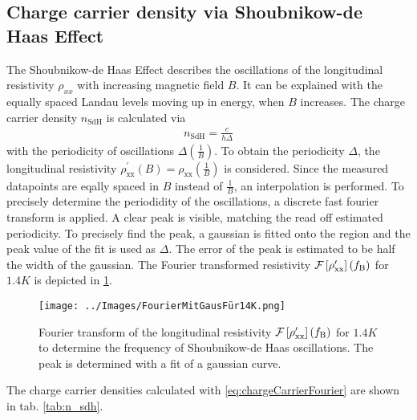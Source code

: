 \subsection{Charge carrier density via Shoubnikow-de Haas Effect}
The Shoubnikow-de Haas Effect describes the oscillations of the longitudinal resistivity $\rho_{xx}$ with increasing magnetic field $B$.
It can be explained with the equally spaced Landau levels moving up in energy, when $B$ increases.
The charge carrier density $n_\text{SdH}$ is calculated via
\begin{align}
    n_\text{SdH} = \frac{e}{h\Delta}
    \label{eq:chargeCarrierFourier}
\end{align} 
with the periodicity of oscillations $\Delta\left(\frac{1}{B}\right)$.
To obtain the periodicity $\Delta$, the longitudinal resistivity $\rho^\prime_\text{xx}\left(B\right)=\rho_\text{xx}\left(\frac{1}{B}\right)$ is considered.
Since the measured datapoints are eqally spaced in $B$ instead of $\frac{1}{B}$, an interpolation is performed.
To precisely determine the periodidity of the oscillations, a discrete fast fourier transform is applied.
A clear peak is visible, matching the read off estimated periodicity.
To precisely find the peak, a gaussian is fitted onto the region and the peak value of the fit is used as $\Delta$.
The error of the peak is estimated to be half the width of the gaussian.
The Fourier transformed resistivity $\mathcal{F}\left[ \rho^\prime_\text{xx}\right]\left(f_\text B\right)$ for 
$1.4K$ is depicted in \ref{fig:Fourier}.
\begin{figure}[h]
    \centering
    \texttt{[image: ../Images/FourierMitGausFür14K.png]}
    \caption{Fourier transform of the longitudinal resistivity 
    $\mathcal{F}\left[ \rho^\prime_\text{xx}\right]\left(f_\text B\right)$ 
    for $1.4K$ to determine the frequency of Shoubnikow-de Haas oscillations.
    The peak is determined with a fit of a gaussian curve.
    }
    \label{fig:Fourier}
\end{figure}
The charge carrier densities calculated with \ref{eq:chargeCarrierFourier} are shown in tab. \ref{tab:n_sdh}.
